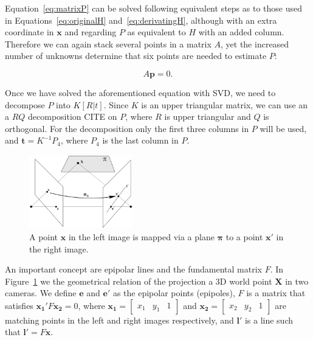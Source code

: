 \documentclass[12pt]{article}
\begin{document}
Equation~\ref{eq:matrixP} can be solved following equivalent steps as to those used in Equations~\ref{eq:originalH} and~\ref{eq:derivatingH}, although with an extra coordinate in $\mathbf{x}$ and regarding $P$ as equivalent to $H$ with an added column.
Therefore we can again stack several points in a matrix $A$, yet the increased number of unknowns determine that six points are needed to estimate $P$:

\begin{equation}
A\mathbf{p} = 0.
\end{equation}

Once we have solved the aforementioned equation with SVD, we need to decompose $P$ into $K[R|t]$.
Since $K$ is an upper triangular matrix, we can use an a $RQ$ decomposition CITE on $P$, where $R$ is upper triangular and $Q$ is orthogonal.
For the decomposition only the first three columns in $P$ will be used, and $\mathbf{t} = K^{-1}P_4$, where $P_4$ is the last column in $P$.


\begin{figure}[htbp!]
	\centering
	\includegraphics[width=0.4\textwidth]{images/epipolarLines}
	\caption{A point $\mathbf{x}$ in the left image is mapped via a plane $\boldsymbol{\pi}$ to a point $\mathbf{x}'$ in the right image.}\label{fig:epipolarLines}
\end{figure}

An important concept are epipolar lines and the fundamental matrix $F$.
In Figure~\ref{fig:epipolarLines} we the geometrical relation of the projection a 3D world point $\mathbf{X}$ in two cameras.
We define $\mathbf{e}$ and $\mathbf{e}'$ as the epipolar points (epipoles), $F$ is a matrix that satisfies $\mathbf{x_1}'F\mathbf{x_2} = 0$, where $\mathbf{x_1} = \begin{bmatrix} x_1 & y_1 & 1 \end{bmatrix}$ and $\mathbf{x_2} = \begin{bmatrix} x_2 & y_2 & 1 \end{bmatrix}$ are matching points in the left and right images respectively, and $\mathbf{l}'$ is a line such that $\mathbf{l}' = F\mathbf{x}$.
\end{document}
